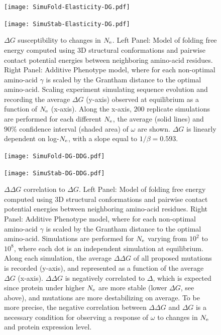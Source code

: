 \begin{figure}[H]
	\centering
	\begin{minipage}{0.49\linewidth}
		\texttt{[image: SimuFold-Elasticity-DG.pdf]}
	\end{minipage}%
	\hfill
	\begin{minipage}{0.49\linewidth}
		\texttt{[image: SimuStab-Elasticity-DG.pdf]}
	\end{minipage}
	\caption[$\Delta G$ susceptibility to changes in $\Ne$]{
		$\Delta G$ susceptibility to changes in $\Ne$.
		Left Panel: Model of folding free energy computed using 3D structural conformations and pairwise contact potential energies between neighboring amino-acid residues. 
		Right Panel: Additive \gls{Phenotype} model, where for each non-optimal amino-acid $\gamma$ is scaled by the Grantham distance to the optimal amino-acid.
		Scaling experiment simulating sequence evolution and recording the average $\Delta G$ (y-axis) observed at equilibrium as a function of $\Ne$ (x-axis).
		Along the x-axis, $200$ replicate simulations are performed for each different $\Ne$, the average (solid lines) and $90\%$ confidence interval (shaded area) of $\omega$ are shown.
		$\Delta G$ is linearly dependent on log-$\Ne$, with a slope equal to $1/\beta=0.593$.
	}
\end{figure}

\begin{figure}[H]
	\centering
	\begin{minipage}{0.49\linewidth}
		\texttt{[image: SimuFold-DG-DDG.pdf]}
	\end{minipage}%
	\hfill
	\begin{minipage}{0.49\linewidth}
		\texttt{[image: SimuStab-DG-DDG.pdf]}
	\end{minipage}

	\caption[$\Delta \Delta G$ correlation to $\Delta G$]{
		$\Delta \Delta G$ correlation to $\Delta G$.
		Left Panel: Model of folding free energy computed using 3D structural conformations and pairwise contact potential energies between neighboring amino-acid residues. 
		Right Panel: Additive \gls{Phenotype} model, where for each non-optimal amino-acid $\gamma$ is scaled by the Grantham distance to the optimal amino-acid.
		Simulations are performed for $\Ne$ varying from $10^2$ to $10^8$, where each dot is an independent simulation at equilibrium.
		Along each simulation, the average $\Delta \Delta G$ of all proposed mutations is recorded (y-axis), and represented as a function of the average $\Delta G$ (x-axis).
		$\Delta \Delta G$ is negatively correlated to $\Delta$, which is expected since protein under higher $\Ne$ are more stable (lower $\Delta G$, see above), and mutations are more destabilizing on average.
		To be more precise, the negative correlation between $\Delta \Delta G$ and $\Delta G$ is a necessary condition for observing a response of $\omega$ to changes in $\Ne$ and protein expression level\citep{Serohijos2012, Goldstein2013}. 
	}
\end{figure}


